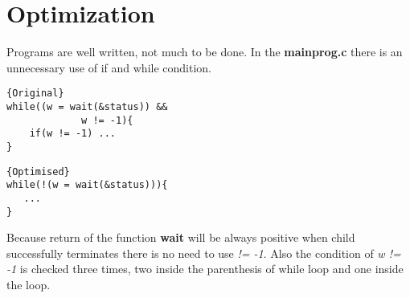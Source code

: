 \documentclass[11pt]{article}
\begin{document}
\section*{Optimization}
Programs are well written, not much to be done. In the \textbf{mainprog.c} there is an unnecessary use of if and while condition.

\noindent\begin{minipage}{.45\textwidth}
\begin{lstlisting}[caption=Original,frame=tlrb]{Original}
while((w = wait(&status)) &&
	         w != -1){
	if(w != -1) ...
}
\end{lstlisting}
\end{minipage}\hfill
\begin{minipage}{.50\textwidth}
\begin{lstlisting}[caption=Optimised,frame=tlrb]{Optimised}
while(!(w = wait(&status))){
   ...
}
\end{lstlisting}
\end{minipage}
Because return of the function \textbf{wait} will be always positive when child successfully terminates there is no need to use \textit{!= -1}.  Also the condition of \textit{w != -1} is checked three times, two inside the parenthesis of while loop and one inside the loop.
\end{document}
